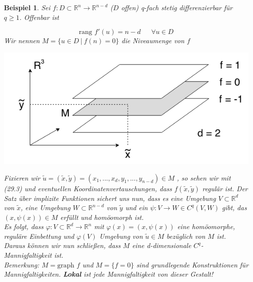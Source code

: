\documentclass[a4paper,12pt,portrait]{book}
\newcommand{\graph}{\text{graph\ }}
\newcommand{\rang}{\text{rang\ }}
\theoremstyle{theoremstyle}
\newtheorem{beispiel}[theo]{Beispiel}
\begin{document}
\begin{beispiel}
Sei $f:D\subset\mathbb{R}^n\rightarrow\mathbb{R}^{n-d}$ ($D$ offen) q-fach stetig differenzierbar für $q\geq 1$. Offenbar ist

\begin{equation}
\rang f'(u)=n-d \ \ \ \ \ \ \ \forall u\in D
\end{equation}
Wir nennen $M=\{u\in D \ | \ f(n)=0\}$ die Niveaumenge von $f$\\

\begin{center}\includegraphics[scale=0.5]{pictures/MA2_0009}\\
\end{center}
Fixieren wir $\tilde{u}=(\tilde{x},\tilde{y})=(x_1,...,x_d,y_1,...,y_{n-d})\in M$
, so sehen wir mit (29.3) und eventuellen Koordinatenvertauschungen, dass 
$f(\tilde{x},\tilde{y})$ regulär ist. Der \emph{Satz über implizite Funktionen}
sichert uns nun, dass es eine Umgebung $V\subset\mathbb{R}^d$ von $\tilde{x}$, 
eine Umgebung $W\subset\mathbb{R}^{n-d}$ von $\tilde{y}$ und ein 
$\psi:V\rightarrow W\in C^q(V,W)$ gibt, das $(x,\psi(x))\in M$ erfüllt und homöomorph ist.\\
Es folgt, dass $\varphi:V\subset\mathbb{R}^d\rightarrow\mathbb{R}^n$ mit 
$\varphi(x)=(x,\psi(x))$ eine homöomorphe, reguläre Einbettung  und $\varphi(V)$ 
Umgebung von $\tilde{u}\in M$ bezüglich von $M$ ist. Daraus können wir nun schließen, 
dass $M$ eine d-dimensionale $C^q$-Mannigfaltigkeit ist.\\
\linebreak
\emph{Bemerkung: $M=\graph f$ und $M=\{f=0\}$ sind grundlegende Konstruktionen 
für Mannigfaltigkeiten. \textbf{Lokal} ist jede Mannigfaltigkeit von dieser Gestalt!}
\end{beispiel}
\end{document}
